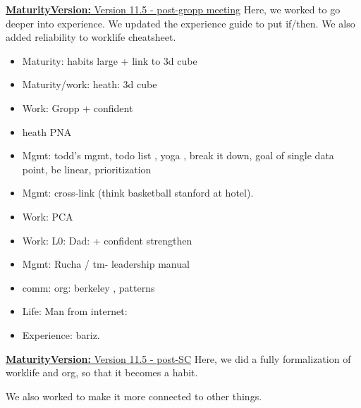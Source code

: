\documentclass[11pt]{article}
\newcommand{\newMaturityVersion}[1]{\underline{\textbf{MaturityVersion:} #1} }
\begin{document}
\newMaturityVersion{Version 11.5 - post-gropp meeting}
Here, we worked to go deeper into experience. We updated the experience guide to put if/then. We also added reliability to worklife cheatsheet. 



\begin{itemize} 
\item Maturity: habits large + link to 3d cube 
\item Maturity/work: heath: 3d cube 
\item Work:  Gropp + confident 
\item heath PNA 
\item Mgmt: todd's mgmt, todo list , yoga , break it down, goal of single data point, be linear, prioritization 
\item Mgmt: cross-link (think basketball stanford at hotel). 

\item Work: PCA
\item Work: L0: Dad: + confident strengthen 
\item Mgmt: Rucha / tm- leadership manual 

\item comm: org: berkeley , patterns 
\item Life: Man from internet: 
\item Experience: bariz. 
\end{itemize}



\newMaturityVersion{Version 11.5 - post-SC}
Here, we did a fully formalization of worklife and org, so that it becomes a habit. 

We also worked to make it more connected to other things. 


\end{document}
